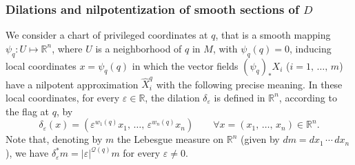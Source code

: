 \documentclass[AHL,Unicode,published]{cedram}
\newcommand*\R{\mathbb{R}}
\newcommand{\calQ}{\mathcal{Q}}
\let\oldforall\forall
\renewcommand*{\forall}{\mathrel{\oldforall}}
\begin{document}
\subsubsection{Dilations and nilpotentization of smooth sections of \texorpdfstring{$D$}{D}}\label{sec_nilp_smoothsection}
We consider a chart of privileged coordinates at $q$, that is a smooth mapping $\psi_{q}:U\mapsto\R^n$, where $U$ is a neighborhood of $q$ in $M$, with $\psi_{q}(q)=0$, inducing local coordinates $x=\psi_{q}(q)$ in which the vector fields $(\psi_{q})_*X_i$ ($i=1,\,\ldots,\,m$) have a nilpotent approximation $\widehat{X}^{q}_i$ with the following precise meaning. In these local coordinates, for every $\varepsilon\in\R$, the dilation $\delta_\varepsilon$ is defined in $\R^n$, according to the flag at $q$, by
\[
\delta_\varepsilon(x) = \left(\varepsilon^{w_1(q)} x_1,\,\ldots, \,\varepsilon^{w_n(q)} x_n \right) \qquad\forall x=(x_1,\,\ldots,\,x_n)\in\R^n.
\]
Note that, denoting by $m$ the Lebesgue measure on $\R^n$ (given by $dm=dx_1\,\cdots\,dx_n$), we have $\delta_\varepsilon^*m=\vert\varepsilon\vert^{\calQ(q)}m$ for every $\varepsilon\neq 0$.
\end{document}
